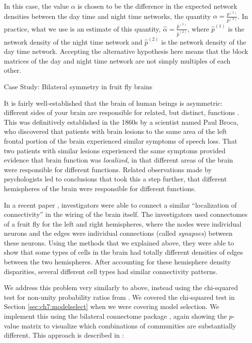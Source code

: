 In this case, the value $\alpha$ is chosen to be the difference in the expected network densities between the day time and night time networks, the quantity $\alpha = \frac{p^{(1)}}{p^{(2)}}$. In practice, what we use is an estimate of this quantity, $\hat \alpha = \frac{\hat p^{(1)}}{\hat p^{(2)}}$, where $\hat p^{(1)}$ is the network density of the night time network and $\hat p^{(2)}$ is the network density of the day time network. Accepting the alternative hypothesis here means that the block matrices of the day and night time network are not simply multiples of each other.

\begin{floatingbox}[h]\caption{Case Study: Bilateral symmetry in fruit fly brains}
\label{box:ch8:twosamp_sbm:conn}
It is fairly well-established that the brain of human beings is asymmetric: different sides of your brain are responsible for related, but distinct, functions \cite{Springer2001Sep}. This was definitively established in the 1860s by a scientist named Paul Broca, who discovered that patients with brain lesions to the same area of the left frontal portion of the brain experienced similar symptoms of speech loss. That two patients with similar lesions experienced the same symptoms provided evidence that brain function was \textit{localized}, in that different areas of the brain were responsible for different functions. Related observations made by psychologists led to conclusions that took this a step further, that different hemispheres of the brain were responsible for different functions.

In a recent paper \cite{Pedigo2022Nov}, investigators were able to connect a similar ``localization of connectivity'' in the wiring of the brain itself. The investigators used connectomes of a fruit fly for the left and right hemispheres, where the nodes were individual neurons and the edges were individual connections (called \textit{synapses}) between these neurons. Using the methods that we explained above, they were able to show that some types of cells in the brain had totally different densities of edges between the two hemispheres. After accounting for these hemisphere density disparities, several different cell types had similar connectivity patterns.
\end{floatingbox}

We address this problem very similarly to above, instead using the chi-squared test for non-unity probability ratios from \cite{Dunnett1977Dec, Chan2003Jan, Miettinen1985Apr}. We covered the chi-squared test in Section \ref{sec:ch7:modelselect} when we were covering model selection. We implement this using the bilateral connectome package \cite{neurodata2023Feb}, again showing the $p$-value matrix to visualize which combinations of communities are substantially different. This approach is described in \cite{Pedigo2022Nov}:

